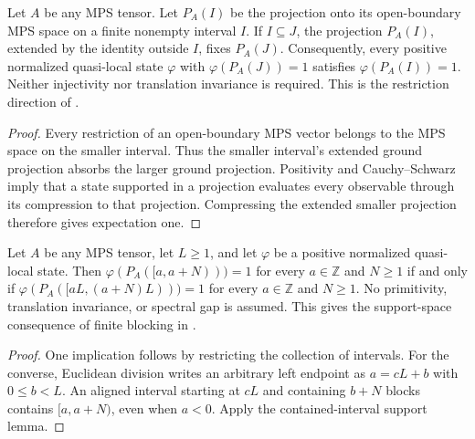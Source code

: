 \begin{lemma}
    \label{thm:mps_support_contained_interval}
    \leanok
    Let $A$ be any MPS tensor. Let $P_A(I)$ be the projection onto its
    open-boundary MPS space on a finite nonempty interval $I$.
    If $I\subseteq J$, the projection $P_A(I)$, extended by the identity
    outside $I$, fixes $P_A(J)$. Consequently, every positive normalized
    quasi-local state $\varphi$ with $\varphi(P_A(J))=1$ satisfies
    $\varphi(P_A(I))=1$. Neither injectivity nor translation invariance
    is required. This is the restriction direction of
    \cite[Section~3, equation~(3.12)]{Nachtergaele1996Spectral}.
\end{lemma}
\begin{proof}\leanok
    Every restriction of an open-boundary MPS vector belongs to the MPS
    space on the smaller interval. Thus the smaller interval's extended
    ground projection absorbs the larger ground projection. Positivity
    and Cauchy--Schwarz imply that a state supported in a projection
    evaluates every observable through its compression to that projection.
    Compressing the extended smaller projection therefore gives expectation
    one.
\end{proof}

\begin{lemma}
    \label{thm:blocked_aligned_mps_support_iff}
    \leanok
    Let $A$ be any MPS tensor, let $L\geq1$, and let $\varphi$ be a positive
    normalized quasi-local state. Then $\varphi(P_A([a,a+N)))=1$ for every $a\in\mathbb Z$ and $N\geq1$
    if and only if $\varphi(P_A([aL,(a+N)L)))=1$ for every $a\in\mathbb Z$
    and $N\geq1$.
    No primitivity, translation invariance, or spectral gap is assumed.
    This gives the support-space consequence of finite blocking in
    \cite[Section~3]{Nachtergaele1996Spectral}.
\end{lemma}
\begin{proof}\leanok
    One implication follows by restricting the collection of intervals.
    For the converse, Euclidean division writes an arbitrary left endpoint
    as $a=cL+b$ with $0\leq b<L$. An aligned interval starting at $cL$
    and containing $b+N$ blocks contains $[a,a+N)$, even when $a<0$.
    Apply the contained-interval support lemma.
\end{proof}

